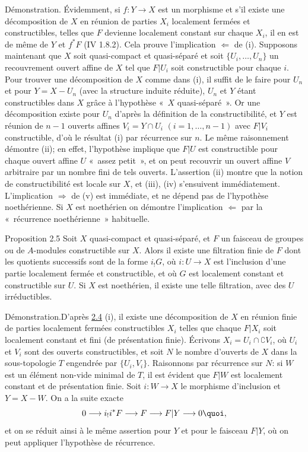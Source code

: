 \documentclass[10pt]{../fichiers-configuration-latex/smfart}
\begin{document}
Démonstration. Évidemment, si $f:Y\rightarrow X$ est un morphisme et
s'il existe une décomposition de $X$ en réunion de parties $X_i$
localement fermées et constructibles, telles que $F$ devienne
localement constant sur chaque $X_i$, il en est de même de $Y$ et
$f^{\ast}F$ (\cf \EGA IV 1.8.2). Cela prouve l'implication $\Leftarrow$
de (i). Supposons maintenant que $X$ soit quasi-compact et
quasi-séparé et soit $\{U_i,\ldots,U_n\}$ un recouvrement ouvert
affine de $X$ tel que $F|U_i$ soit constructible pour chaque
$i$. Pour trouver une décomposition de $X$ comme dans (i), il suffit
de le faire pour $U_n$ et pour $Y=X-U_n$ (avec la structure induite
réduite), $U_n$ et $Y$ étant constructibles dans $X$ grâce à
l'hypothèse « $X$ quasi-séparé ». Or une décomposition existe pour
$U_n$ d'après la définition de la constructibilité, et $Y$ est réunion de
$n-1$ ouverts affines $V_i=Y\cap U_i$ $(i=1,\ldots,n-1)$ avec $F|
V_i$ constructible, d'où le résultat (i) par récurrence sur $n$. Le
même raisonnement démontre (ii); en effet, l'hypothèse implique que
$F| U$ est constructible pour chaque ouvert affine $U$ « assez
petit », et on peut recouvrir un ouvert affine $V$ arbitraire par un
nombre fini de tels ouverts. L'assertion (ii) montre que la notion de
constructibilité est locale sur $X$, et (iii), (iv) s'ensuivent
immédiatement. L'implication $\Rightarrow$ de (v) est immédiate, et ne
dépend pas de l'hypothèse noethérienne. Si $X$ est noethérien on
démontre l'implication $\Leftarrow$ par la « récurrence
noethérienne » habituelle.

\begin{enonce*}{Proposition 2.5}
Soit $X$ quasi-compact et quasi-séparé, et $F$ un faisceau de groupes
ou de $A$-modules constructible sur $X$. Alors il existe une
filtration finie de $F$ dont les quotients successifs sont de la forme
$i_{!}G$, où $i:U\rightarrow X$ est l'inclusion d'une partie
localement fermée et constructible, et où $G$ est localement constant
et constructible sur $U$. Si $X$ est noethérien, il existe une telle
filtration, avec des $U$ irréductibles.
\end{enonce*}

Démonstration.\pageoriginale D'après \hyperref[IX.prop2.4]{2.4} (i), il existe une
décomposition de $X$ en réunion finie de parties localement fermées
constructibles $X_i$ telles que chaque $F|X_i$ soit localement
constant et fini (\resp de présentation finie). Écrivons $X_i=U_i\cap
\complement V_i$, où $U_i$ et $V_i$ sont des ouverts constructibles,
et soit $N$ le nombre d'ouverts de $X$ dans la sous-topologie $T$
engendrée par $\{U_i,V_i\}$. Raisonnons par récurrence sur $N$: si $W$
est un élément non-vide minimal de $T$, il est évident que $F|W$
est localement constant et de présentation finie. Soit $i:W\rightarrow
X$ le morphisme d'inclusion et $Y=X-W$. On a la suite exacte
$$
0\longrightarrow i_{!}i^{\ast}F\longrightarrow F\longrightarrow F|
Y\longrightarrow 0{\quoi},
$$
et on se réduit ainsi à le même assertion pour $Y$ et pour le faisceau
$F| Y$, où on peut appliquer l'hypothèse de récurrence.
\end{document}
